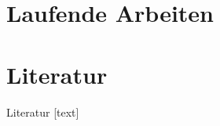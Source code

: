 \documentclass[aspectratio=169]{beamer}
\begin{document}
\section{Laufende Arbeiten}

\section{Literatur}
\begin{frame}[allowframebreaks]{Literatur}
	[text]
	
	
	
\end{frame}
\end{document}
